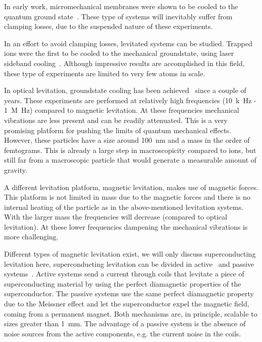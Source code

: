 In early work, micromechanical membranes were shown to be cooled to the quantum ground state~\cite{Connell2010, Teufel2011, Chan2011, Safavi2012, Jockel2015}. These type of systems will inevitably suffer from clamping losses, due to the suspended nature of these experiments.

In an effort to avoid clamping losses, levitated systems can be studied. Trapped ions were the first to be cooled to the mechanical groundstate, using laser sideband cooling~\cite{Diedrich1989, Monroe1995, Leibfried2003}. Although impressive results are accomplished in this field, these type of experiments are limited to very few atoms in scale.

In optical levitation, groundstate cooling has been achieved~\cite{Delic2020, Tebbenjohanns2021, Magrini2021, piotrowski2023} since a couple of years. These experiments are performed at relatively high frequencies (\SI{10}{k\hertz} - \SI{1}{M\hertz}) compared to magnetic levitation. At these frequencies mechanical vibrations are less present and can be readily attenuated. This is a very promising platform for pushing the limits of quantum mechanical effects. However, these particles have a size around \SI{100}{nm} and a mass in the order of femtograms. This is already a large step in macroscopicity compared to ions, but still far from a macroscopic particle that would generate a measurable amount of gravity.

A different levitation platform, magnetic levitation, makes use of magnetic forces. This platform is not limited in mass due to the magnetic forces and there is no internal heating of the particle as in the above-mentioned levitation systems. With the larger mass the frequencies will decrease (compared to optical levitation). At these lower frequencies dampening the mechanical vibrations is more challenging.

Different types of magnetic levitation exist, we will only discuss superconducting levitation here, superconducting levitation can be divided in active~\cite{Bob, Gutierrez2020, Gutierrez2022, Hofer2023, Gutierrez2023, Schmidt2024, Paradkar2025, Hansen2026} and passive systems~\cite{Timberlake2019, Vinante2020, Vinante2022, Timberlake2024}. Active systems send a current through coils that levitate a piece of superconducting material by using the perfect diamagnetic properties of the superconductor. The passive systems use the same perfect diamagnetic property due to the Meissner effect and let the superconductor expel the magnetic field, coming from a permanent magnet. Both mechanisms are, in principle, scalable to sizes greater than \SI{1}{mm}. The advantage of a passive system is the absence of noise sources from the active components, e.g. the current noise in the coils.


